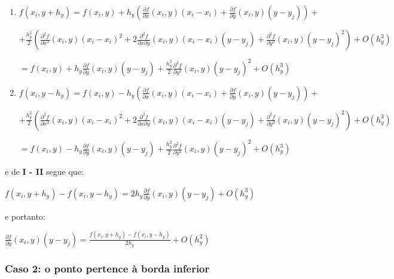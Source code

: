 \documentclass[11pt]{article}
\begin{document}
  \begin{enumerate}[label=\textbf{\Roman*)}]
    \item $f(x_i, y + h_y) = f(x_i, y) + h_y\left(\frac{\partial f}{\partial x}\left(x_i, y \right)\left(x_i - x_i \right) + \frac{\partial f}{\partial y}\left(x_i, y \right)\left(y - y_j \right) \right) +$

    $+ \frac{h_y^2}{2}\left(\frac{\partial^2 f}{\partial x^2}\left(x_i, y\right)\left(x_i - x_i\right)^2 + 2\frac{\partial^2 f}{\partial x \partial y}\left(x_i, y \right)\left(x_i - x_i\right)\left(y - y_j\right) +
    \frac{\partial^2 f}{\partial y^2}\left(x_i, y\right)\left(y - y_j\right)^2 \right) + O(h_y^3)$

    $= f(x_i, y) + h_y\frac{\partial f}{\partial y}\left(x_i, y \right)\left(y - y_j \right) + \frac{h_y^2}{2}\frac{\partial^2 f}{\partial y^2}\left(x_i, y\right)\left(y - y_j\right)^2 + O(h_y^3)$


    \item $f(x_i, y - h_y) = f(x_i, y) - h_y\left(\frac{\partial f}{\partial x}\left(x_i, y \right)\left(x_i - x_i \right) + \frac{\partial f}{\partial y}\left(x_i, y \right)\left(y - y_j \right) \right) +$

    $+ \frac{h_y^2}{2}\left(\frac{\partial^2 f}{\partial x^2}\left(x_i, y\right)\left(x_i - x_i\right)^2 + 2\frac{\partial^2 f}{\partial x \partial y}\left(x_i, y \right)\left(x_i - x_i\right)\left(y - y_j\right) +
    \frac{\partial^2 f}{\partial y^2}\left(x_i, y\right)\left(y - y_j\right)^2 \right) + O(h_y^3)$

    $= f(x_i, y) - h_y\frac{\partial f}{\partial y}\left(x_i, y \right)\left(y - y_j \right) + \frac{h_y^2}{2}\frac{\partial^2 f}{\partial y^2}\left(x_i, y\right)\left(y - y_j\right)^2 + O(h_y^3)$
  \end{enumerate}

  e de \textbf{I - II} segue que:

  $f(x_i, y + h_y) - f(x_i, y - h_y) = 2h_y\frac{\partial f}{\partial y}\left(x_i, y \right)\left(y - y_j \right) + O(h_y^3)$

  e portanto:

  $\frac{\partial f}{\partial y}\left(x_i, y \right)\left(y - y_j \right) = \frac{f(x_i, y + h_y) - f(x_i, y - h_y)}{2h_y}  + O(h_y^2)$

  \subsubsection{Caso 2: o ponto pertence à borda inferior}
\end{document}
